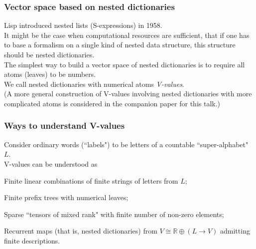 \documentclass{beamer}
\newcommand{\msgray}[1]{{\color{mygray} #1}}
\begin{document}
\begin{frame}

  \frametitle{Vector space based on nested dictionaries}

Lisp introduced nested lists (S-expressions) in 1958.\\[2ex]

It might be the case when computational resources are sufficient, 
that if one has to base a formalism on a single kind of nested data structure, this structure should be nested dictionaries.\\[2ex]

The simplest way to build a vector space of nested dictionaries is to require
all atoms (leaves) to be numbers.\\[2ex]

We call nested dictionaries with numerical atoms {\em V-values}.\\[2ex]

(A more general construction of V-values involving nested dictionaries with more complicated atoms is considered in the companion paper for this talk.)

\end{frame}



\begin{frame}

  \frametitle{Ways to understand V-values}

Consider ordinary words (``labels") to be letters of a countable ``super-alphabet" $L$.\\[2ex]

\msgray{V-values can be understood as}

\begin{itemize}

\msgray{
  \item Finite linear combinations of finite strings of letters from $L$;
  \item Finite prefix trees with numerical leaves;
  \item Sparse ``tensors of mixed rank" with finite number of non-zero elements;
  \item Recurrent maps (that is, nested dictionaries) from $V \cong \mathbb{R}\oplus (L \rightarrow V)$  admitting finite descriptions.
}

\end{itemize}


\end{frame}
\end{document}
